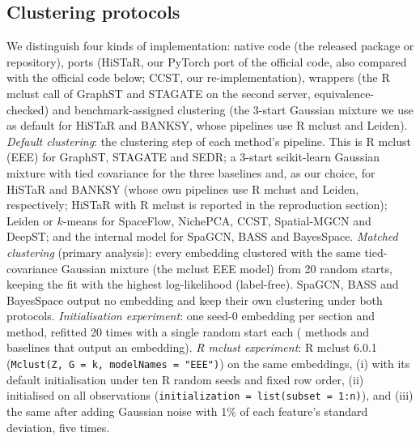 \documentclass[unnumsec,webpdf,contemporary,large]{oup-authoring-template}
\begin{document}
\subsection{Clustering protocols}
We distinguish four kinds of implementation: native code (the released package or repository), ports (HiSTaR, our PyTorch port of the
official code, also compared with the official code below; CCST, our re-implementation), wrappers (the R mclust call of GraphST and STAGATE on
the second server, equivalence-checked) and benchmark-assigned clustering (the 3-start Gaussian mixture we use as default for HiSTaR and
BANKSY, whose pipelines use R mclust and Leiden). \emph{Default clustering}: the clustering step of each method's pipeline. This is R mclust (EEE) for GraphST, STAGATE and
SEDR; a 3-start scikit-learn Gaussian mixture with tied covariance \citep{pedregosa2011sklearn} for the three baselines and, as our choice, for
HiSTaR and BANKSY (whose own pipelines use R mclust and Leiden, respectively; HiSTaR with R mclust is reported in the reproduction section); Leiden or $k$-means for SpaceFlow, NichePCA, CCST, Spatial-MGCN and DeepST; and the internal model for SpaGCN, BASS and
BayesSpace. \emph{Matched clustering} (primary analysis): every embedding clustered with the same tied-covariance Gaussian mixture
(the mclust EEE model) from 20 random starts, keeping the fit with the highest log-likelihood (label-free). SpaGCN, BASS and
BayesSpace output no embedding and keep their own clustering under both protocols.
\emph{Initialisation experiment}: one seed-0 embedding per section and method, refitted 20 times with a single random start
each (\lotNMethods{} methods and baselines that output an embedding). \emph{R mclust experiment}: R mclust 6.0.1
(\texttt{Mclust(Z, G = k, modelNames = "EEE")}) on the same embeddings, (i) with its default initialisation under ten R random
seeds and fixed row order, (ii) initialised on all observations (\texttt{initialization = list(subset = 1:n)}), and (iii) the
same after adding Gaussian noise with 1\% of each feature's standard deviation, five times.
\end{document}

